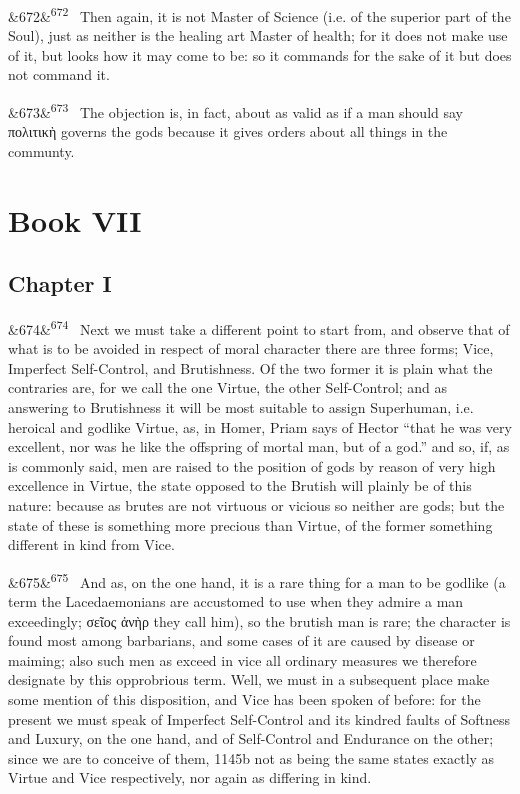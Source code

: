 \documentclass[12pt]{article}
\newcommand{\para}[1][]{\par\noindent\ifx&#1&\else\textsuperscript{\footnotesize #1}~\fi}
\begin{document}
\para[672] Then again, it is not Master of Science (i.e. of the superior part of the Soul), just as neither is the healing art Master of health; for it does not make use of it, but looks how it may come to be: so it commands for the sake of it but does not command it.

\para[673] The objection is, in fact, about as valid as if a man should say πολιτικὴ governs the gods because it gives orders about all things in the communty.

\section*{Book VII}

\subsection*{Chapter I}

\para[674] Next we must take a different point to start from, and observe that of what is to be avoided in respect of moral character there are three forms; Vice, Imperfect Self-Control, and Brutishness. Of the two former it is plain what the contraries are, for we call the one Virtue, the other Self-Control; and as answering to Brutishness it will be most suitable to assign Superhuman, i.e. heroical and godlike Virtue, as, in Homer, Priam says of Hector “that he was very excellent, nor was he like the offspring of mortal man, but of a god.” and so, if, as is commonly said, men are raised to the position of gods by reason of very high excellence in Virtue, the state opposed to the Brutish will plainly be of this nature: because as brutes are not virtuous or vicious so neither are gods; but the state of these is something more precious than Virtue, of the former something different in kind from Vice.

\para[675] And as, on the one hand, it is a rare thing for a man to be godlike (a term the Lacedaemonians are accustomed to use when they admire a man exceedingly; σεῖος ἀνὴρ they call him), so the brutish man is rare; the character is found most among barbarians, and some cases of it are caused by disease or maiming; also such men as exceed in vice all ordinary measures we therefore designate by this opprobrious term. Well, we must in a subsequent place make some mention of this disposition, and Vice has been spoken of before: for the present we must speak of Imperfect Self-Control and its kindred faults of Softness and Luxury, on the one hand, and of Self-Control and Endurance on the other; since we are to conceive of them, 1145b not as being the same states exactly as Virtue and Vice respectively, nor again as differing in kind.
\end{document}
